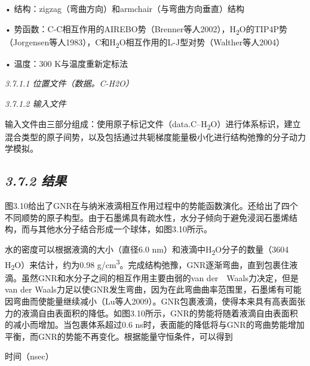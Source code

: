 • 结构：zigzag（弯曲方向）和armchair（与弯曲方向垂直）结构

•
势函数：C-C相互作用的AIREBO势（Brenner等人2002），H\textsubscript{2}O的TIP4P势（Jorgensen等人1983），C和H\textsubscript{2}O相互作用的L-J型对势（Walther等人2004）

• 温度：300 K与温度重新定标法

\emph{3.7.1.1 位置文件（数据。C-H2O）}



\emph{3.7.1.2 输入文件}

输入文件由三部分组成：使用原子标记文件（data.C--H\textsubscript{2}O）进行体系标识，建立混合类型的原子间势，以及包括通过共轭梯度能量极小化进行结构弛豫的分子动力学模拟。



\hypertarget{ux7ed3ux679c-6}{%
\subsection{\texorpdfstring{\emph{3.7.2
结果}}{3.7.2 结果}}\label{ux7ed3ux679c-6}}

图3.10给出了GNR在与纳米液滴相互作用过程中的势能函数演化。还给出了四个不同顺势的原子构型。由于石墨烯具有疏水性，水分子倾向于避免浸润石墨烯结构，而与其他水分子结合形成一个球体，如图3.10所示。

水的密度可以根据液滴的大小（直径6.0
nm）和液滴中H\textsubscript{2}O分子的数量（3604
H\textsubscript{2}O）来估计，约为0.98
g/cm\textsuperscript{3}。完成结构弛豫，GNR逐渐弯曲，直到包裹住液滴。虽然GNR和水分子之间的相互作用主要由弱的van
der　Waals力决定，但是van der
Waals力足以使GNR发生弯曲，因为在此弯曲曲率范围里，石墨烯有可能因弯曲而使能量继续减小（Lu等人2009）。GNR包裹液滴，使得本来具有高表面张力的液滴自由表面积的降低。如图3.10所示，GNR的势能将随着液滴自由表面积的减小而增加。当包裹体系超过0.6
ns时，表面能的降低将与GNR的弯曲势能增加平衡，而GNR的势能不再变化。根据能量守恒条件，可以得到



时间（nsec）

